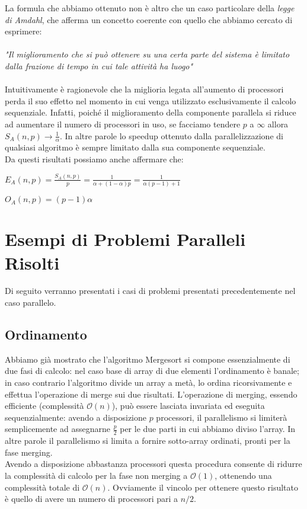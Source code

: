 \newpage
\noindent La formula che abbiamo ottenuto non è altro che un caso particolare della \textit{legge di Amdahl}, che afferma un concetto coerente con quello che abbiamo cercato di esprimere:\\ \\
\textit{"Il miglioramento che si può ottenere su una certa parte del sistema è limitato dalla frazione di tempo in cui tale attività ha luogo"}\\ \\
Intuitivamente è ragionevole che la miglioria legata all'aumento di processori perda il suo effetto nel momento in cui venga utilizzato esclusivamente il calcolo sequenziale. Infatti, poiché il miglioramento della componente parallela si riduce ad aumentare il numero di processori in uso, se facciamo tendere $p$ a $\infty$ allora $S_A(n,p) \rightarrow \frac{1}{\alpha}$. In altre parole lo speedup ottenuto dalla parallelizzazione di qualsiasi algoritmo è sempre limitato dalla sua componente sequenziale.\\
Da questi risultati possiamo anche affermare che:
\begin{center}
$\displaystyle E_{A}(n,p) = \frac{S_{A}(n,p)}{p} = \frac{1}{\alpha + (1 - \alpha)p} = \frac{1}{\alpha (p-1) + 1}$
\end{center}
\begin{center}
$\displaystyle O_A(n,p) = (p - 1) \alpha$
\end{center}
\chapter{Esempi di Problemi Paralleli Risolti}
Di seguito verranno presentati i casi di problemi presentati precedentemente nel caso parallelo.
\section{Ordinamento}
Abbiamo già mostrato che l'algoritmo Mergesort si compone essenzialmente di due fasi di calcolo: nel caso base di array di due elementi l'ordinamento è banale; in caso contrario l'algoritmo divide un array a metà, lo ordina ricorsivamente e effettua l'operazione di merge sui due risultati. L'operazione di merging, essendo efficiente (complessità $\mathcal{O}(n)$), può essere lasciata invariata ed eseguita sequenzialmente: avendo a disposizione $p$ processori, il parallelismo si limiterà semplicemente ad assegnarne $\frac{p}{2}$ per le due parti in cui abbiamo diviso l'array. In altre parole il parallelismo si limita a fornire sotto-array ordinati, pronti per la fase merging.\\
Avendo a disposizione abbastanza processori questa procedura consente di ridurre la complessità di calcolo per la fase non merging a $\mathcal{O}(1)$, ottenendo una complessità totale di $\mathcal{O}(n)$. Ovviamente il vincolo per ottenere questo risultato è quello di avere un numero di processori pari a $n/2$.
\newpage
\noindent
